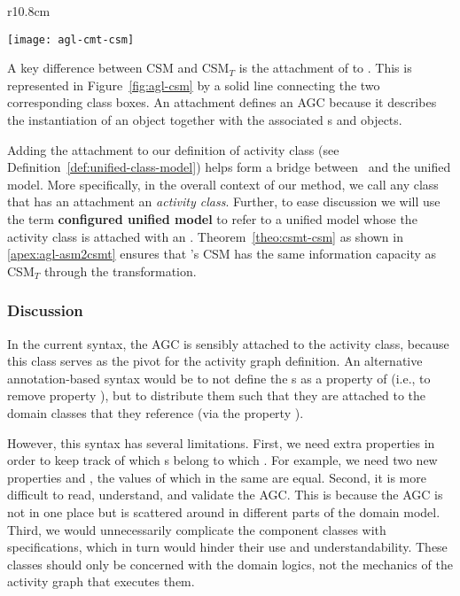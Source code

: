 {\makeatletter
	\let\par\@@par
	\par{}
	\everypar{}
	\begin{wrapfigure}{r}{10.8cm}
		\begin{center}
			\vspace{-0.6cm}		
			\texttt{[image: agl-cmt-csm]}
		\end{center}
		\vspace{-0.5cm}
		\caption{ The concrete syntax model (CSM) of AGL.} %
		\label{fig:agl-csm}
	\end{wrapfigure}

A key difference between CSM and CSM$_T$ is the attachment of  to . This is represented in Figure~\ref{fig:agl-csm} by a solid line connecting the two corresponding class boxes. An  attachment defines an AGC because it describes the instantiation of an  object together with the associated s and  objects.

Adding the  attachment to our definition of activity class (see Definition~\ref{def:unified-class-model}) helps form a bridge between \agl~and the unified model. More specifically, in the overall context of our method, we call any class that has an  attachment an \textit{activity class}.
Further, to ease discussion we will use the term \textbf{configured unified model} to refer to a unified model whose the activity class is attached with an . Theorem~\ref{theo:csmt-csm} as shown in \ref{apex:agl-asm2csmt} ensures that \agl's CSM has the same information capacity as CSM$_T$ through the transformation.
%
\subsubsection*{Discussion} \label{sect:agl-discussion} %
In the current syntax, the AGC is sensibly attached to the activity class, because this class serves as the pivot for the activity graph definition.
%
An alternative annotation-based syntax would be to not define the s as a property of  (i.e., to remove property ), but to distribute them such that they are attached to the domain classes that they reference (via the property ). 

However, this syntax has several limitations. First, we need extra properties in order to keep track of which s belong to which . For example, we need two new properties  and , the values of which in the same  are equal. 
Second, it is more difficult to read, understand, and validate the AGC. This is because the AGC is not in one place but is scattered around in different parts of the domain model.
Third, we would unnecessarily complicate the component classes with  specifications, which in turn would hinder their use and understandability. These classes should only be concerned with the domain logics, not the mechanics of the activity graph that executes them.

}
